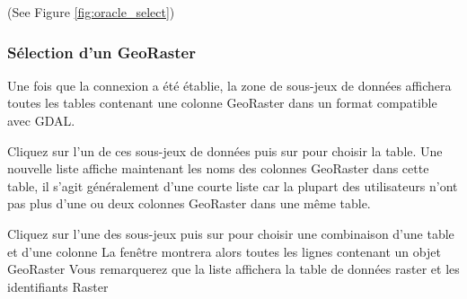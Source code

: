
(See Figure \ref{fig:oracle_select})

\subsubsection{Sélection d'un GeoRaster}


Une fois que la connexion a été établie, la zone de sous-jeux de données affichera toutes les tables contenant une colonne GeoRaster dans un format compatible avec GDAL.


Cliquez sur l'un de ces sous-jeux de données puis sur  pour choisir la table. Une nouvelle liste affiche maintenant les noms des colonnes GeoRaster dans cette table, il s'agit généralement d'une courte liste car la plupart des utilisateurs n'ont pas plus d'une ou deux colonnes GeoRaster dans une même table.


Cliquez sur l'une des sous-jeux puis sur  pour choisir une combinaison d'une table et d'une colonne La fenêtre montrera alors toutes les lignes contenant un objet GeoRaster Vous remarquerez que la liste affichera la table de données raster et les identifiants Raster

